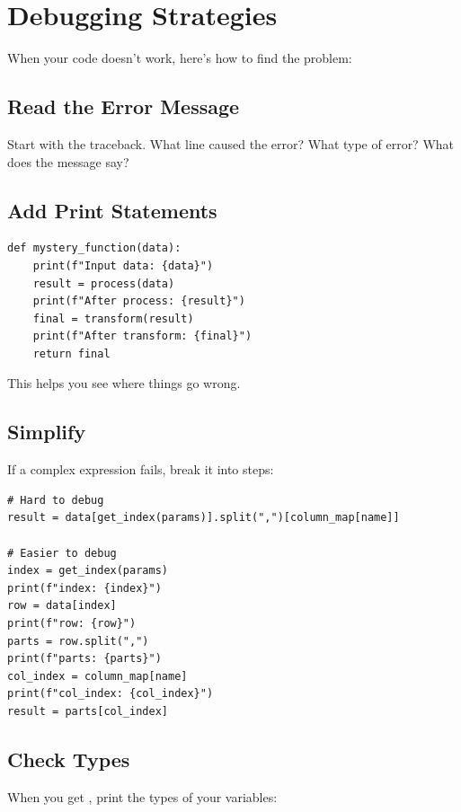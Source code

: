 \section{Debugging Strategies}
\label{sec:debugging}

When your code doesn't work, here's how to find the problem:

\subsection{Read the Error Message}

Start with the traceback. What line caused the error? What type of error? What does the message say?

\subsection{Add Print Statements}

\begin{lstlisting}
def mystery_function(data):
    print(f"Input data: {data}")
    result = process(data)
    print(f"After process: {result}")
    final = transform(result)
    print(f"After transform: {final}")
    return final
\end{lstlisting}

This helps you see where things go wrong.

\subsection{Simplify}

If a complex expression fails, break it into steps:

\begin{lstlisting}
# Hard to debug
result = data[get_index(params)].split(",")[column_map[name]]

# Easier to debug
index = get_index(params)
print(f"index: {index}")
row = data[index]
print(f"row: {row}")
parts = row.split(",")
print(f"parts: {parts}")
col_index = column_map[name]
print(f"col_index: {col_index}")
result = parts[col_index]
\end{lstlisting}

\subsection{Check Types}

When you get , print the types of your variables:

